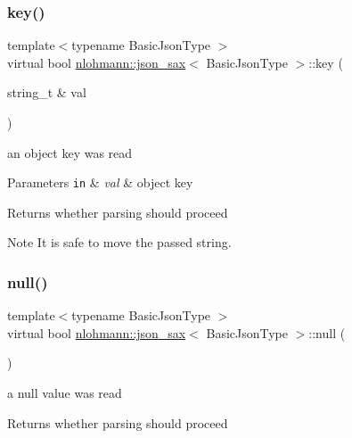 \subsubsection{\texorpdfstring{key()}{key()}}
{\footnotesize\ttfamily template$<$typename Basic\+Json\+Type $>$ \\
virtual bool \hyperlink{structnlohmann_1_1json__sax}{nlohmann\+::json\+\_\+sax}$<$ Basic\+Json\+Type $>$\+::key (\begin{DoxyParamCaption}\item[{string\+\_\+t \&}]{val }\end{DoxyParamCaption})\hspace{0.3cm}{\ttfamily [pure virtual]}}



an object key was read 


\begin{DoxyParams}[1]{Parameters}
\mbox{\tt in}  & {\em val} & object key \\
\hline
\end{DoxyParams}
\begin{DoxyReturn}{Returns}
whether parsing should proceed 
\end{DoxyReturn}
\begin{DoxyNote}{Note}
It is safe to move the passed string. 
\end{DoxyNote}
\mbox{\label{structnlohmann_1_1json__sax_a0ad26edef3f8d530dcec3192bba82df6}} 
\subsubsection{\texorpdfstring{null()}{null()}}
{\footnotesize\ttfamily template$<$typename Basic\+Json\+Type $>$ \\
virtual bool \hyperlink{structnlohmann_1_1json__sax}{nlohmann\+::json\+\_\+sax}$<$ Basic\+Json\+Type $>$\+::null (\begin{DoxyParamCaption}{ }\end{DoxyParamCaption})\hspace{0.3cm}{\ttfamily [pure virtual]}}



a null value was read 

\begin{DoxyReturn}{Returns}
whether parsing should proceed 
\end{DoxyReturn}
\mbox{\label{structnlohmann_1_1json__sax_ae7c31614e8a82164d2d7f8dbf4671b25}} 
